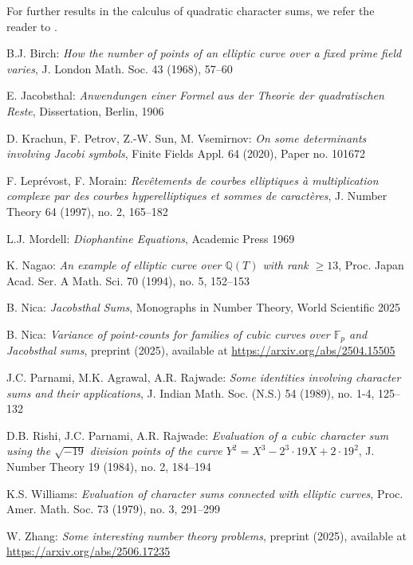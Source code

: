 \documentclass[11pt]{amsart}
\newcommand{\Q}{\mathbb{Q}}
\newcommand{\F}{\mathbb{F}}
\newcommand{\Fp}{\F_{\!p}}
\theoremstyle{definition}
\begin{document}
For further results in the calculus of quadratic character sums, we refer the reader to \cite[Chap.5]{N}.


\begin{thebibliography}{88}
 B.J. Birch: \emph{How the number of points of an elliptic curve over a fixed prime field varies}, J. London Math. Soc. 43 (1968), 57--60


 E. Jacobsthal: \emph{Anwendungen einer Formel aus der Theorie der quadratischen Reste}, Dissertation, Berlin, 1906


 D. Krachun, F. Petrov, Z.-W. Sun, M. Vsemirnov: \emph{On some determinants involving Jacobi symbols}, Finite Fields Appl. 64 (2020), Paper no. 101672

 F. Lepr\'evost, F. Morain: \emph{Rev\^{e}tements de courbes elliptiques \`{a} multiplication complexe par des courbes hyperelliptiques et sommes de caract\`{e}res}, J. Number Theory 64 (1997), no. 2, 165--182

 L.J. Mordell: \emph{Diophantine Equations}, Academic Press 1969

 K. Nagao: \emph{ An example of elliptic curve over $\Q(T)$ with rank $\geq 13$}, Proc. Japan Acad. Ser. A Math. Sci. 70 (1994), no. 5, 152--153

 B. Nica: \emph{Jacobsthal Sums}, Monographs in Number Theory, World Scientific 2025

 B. Nica: \emph{Variance of point-counts for families of cubic curves over $\Fp$ and Jacobsthal sums}, preprint (2025), available at \url{https://arxiv.org/abs/2504.15505}


 J.C. Parnami, M.K. Agrawal, A.R. Rajwade: \emph{Some identities involving character sums and their applications}, J. Indian Math. Soc. (N.S.) 54 (1989), no. 1-4, 125--132

 D.B. Rishi, J.C. Parnami, A.R. Rajwade: \emph{Evaluation of a cubic character sum using the $\sqrt{-19}$ division points of the curve $Y^2=X^3-2^3\cdot 19 X+2\cdot 19^2$}, J. Number Theory 19 (1984), no. 2, 184--194

 K.S. Williams: \emph{Evaluation of character sums connected with elliptic curves}, Proc. Amer. Math. Soc. 73 (1979), no. 3, 291--299

 W. Zhang: \emph{Some interesting number theory problems}, preprint (2025), available at \url{https://arxiv.org/abs/2506.17235}

\end{thebibliography}
\end{document}
